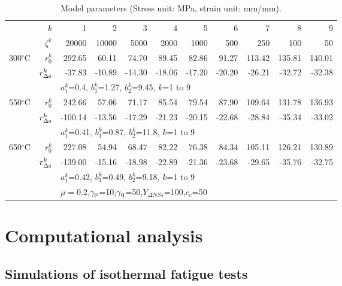 \documentclass[preprint,5p,twocolumn,11pt,sort&compress]{elsarticle}
\begin{document}
\begin{table*}
  \centering
  \caption{Model parameters (Stress unit: MPa, strain unit: mm/mm).}
    \begin{tabular}{rrrrrrrrrrr}
    \hline
          & $k$   & 1     & 2     & 3     & 4     & 5     & 6     & 7     & 8     & 9 \\
          & $\zeta^k$ & 20000 & 10000 & 5000  & 2000  & 1000  & 500   & 250   & 100   & 50 \\
    \hline
    300$^{\circ}$C & $r_0^k$ & 292.65  & 60.11  & 74.70  & 89.45  & 82.86  & 91.27  & 113.42  & 135.81  & 140.01  \\
          & $r_{\Delta \rm s}^k$ & -37.83  & -10.89  & -14.30  & -18.06  & -17.20  & -20.20  & -26.21  & -32.72  & -32.38  \\
          & & \multicolumn{9}{l}{$a_1^k$=0.4, $b_1^k$=1.27, $b_2^k$=9.45, $k$=1 to 9} \\
    \hline
    550$^{\circ}$C & $r_0^k$ & 242.66  & 57.06  & 71.17  & 85.54  & 79.54  & 87.90  & 109.64  & 131.78  & 136.93  \\
          & $r_{\Delta \rm s}^k$ & -100.14  & -13.56  & -17.29  & -21.23  & -20.15  & -22.68  & -28.84  & -35.34  & -33.02  \\
          & & \multicolumn{9}{l}{$a_1^k$=0.41, $b_1^k$=0.87, $b_2^k$=11.8, $k$=1 to 9} \\
    \hline
    650$^{\circ}$C & $r_0^k$ & 227.08  & 54.94  & 68.47  & 82.22  & 76.38  & 84.34  & 105.11  & 126.21  & 130.89  \\
          & $r_{\Delta \rm s}^k$ & -139.00  & -15.16  & -18.98  & -22.89  & -21.36  & -23.68  & -29.65  & -35.76  & -32.75  \\
          & & \multicolumn{9}{l}{$a_1^k$=0.42, $b_1^k$=0.49, $b_2^k$=9.18, $k$=1 to 9} \\
    \hline
          & & \multicolumn{9}{l}{$\mu=0.2$,$\gamma_{\rm p}$=10,$\gamma_{\rm q}$=50,$Y_{\Delta NSs}$=100,$c_c$=50} \\
    \hline
    \end{tabular}%
  \label{tab:3}%
\end{table*}%

\section{Computational analysis}

\subsection{Simulations of isothermal fatigue tests}
\end{document}

